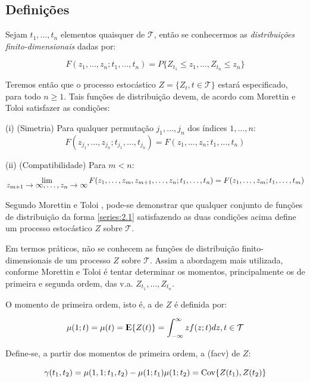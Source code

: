 \subsection{Definições}

Sejam $t_1, \ldots, t_n$ elementos quaisquer de $\mathcal{T}$, então se conhecermos as \emph{distribuições finito-dimensionais} dadas por:

\begin{equation}\label{series:2.1}
F(z_1, \ldots, z_n; t_1, \ldots, t_n) = P\{ Z_{t_1} \leq z_1, \ldots, Z_{t_n} \leq z_n \}
\end{equation}

Teremos então que o processo estocástico $Z = \{ Z_t, t \in \mathcal{T} \}$ estará especificado, para todo $n \geq 1$. Tais funções de distribuição devem, de acordo com Morettin e Toloi \citep{morettin} satisfazer as condições:

	(i) (Simetria) Para qualquer permutação $j_1, \ldots, j_n$ dos índices $1, \dots, n$:
\[ F(z_{j_1}, \ldots, z_{j_n}; t_{j_1}, \ldots, t_{j_n}) = F(z_1, \ldots, z_n; t_1, \ldots, t_n) \]

	(ii) (Compatibilidade) Para $m < n$:
\[ \lim_{\mathlarger{z_{m+1} \to \infty, \ldots, z_n \to \infty}} F(z_1, \ldots, z_m, z_{m+1}, \ldots, z_n; t_1, \ldots, t_n) = F(z_1, \ldots, z_m; t_1, \ldots, t_m) \]

Segundo Morettin e Toloi \citep{morettin}, pode-se demonstrar que qualquer conjunto de funções de distribuição da forma \ref{series:2.1} satisfazendo as duas condições acima define um processo estocástico $Z$ sobre $\mathcal{T}$.

Em termos práticos, não se conhecem as funções de distribuição finito-dimensionais de um processo $Z$ sobre $\mathcal{T}$. Assim a abordagem mais utilizada, conforme Morettin e Toloi \citep{morettin} é tentar determinar os momentos, principalmente os de primeira e segunda ordem, das v.a. $Z_{t_1}, \ldots, Z_{t_n}$. 

O momento de primeira ordem, isto é, a  de $Z$ é definida por: 

\begin{equation}\label{series:2.5}
\mu(1; t) = \mu(t) = {\rm I\kern-.3em E}\{Z(t)\} = \int_{-\infty}^{\infty} z f(z;t)dz, t \in \mathcal{T}
\end{equation}

Define-se, a partir dos momentos de primeira ordem, a  (facv) de $Z$:

\begin{equation}\label{series:2.6}
\gamma(t_1, t_2) = \mu(1,1; t_1,t_2) - \mu(1; t_1)\mu(1; t_2) = \mathrm{Cov}\{Z(t_1),Z(t_2)\}
\end{equation}


